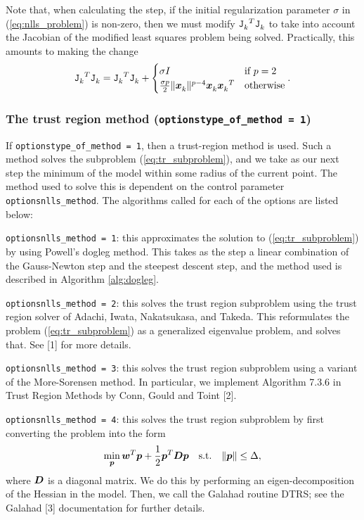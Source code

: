 Note that, when calculating the step, if the initial regularization parameter $\sigma$ in (\ref{eq:nlls_problem}) is 
non-zero, then we must modify ${\iter[k]{\tJ}}^T\iter[k]{\tJ}$  to take into 
account the Jacobian of the modified least squares problem being solved.  Practically, this amounts to making the change
\[
{\iter[k]{\tJ}}^T\iter[k]{\tJ} = {\iter[k]{\tJ}}^T\iter[k]{\tJ} + 
 \begin{cases}
   \sigma I & \text{if }p = 2\\
   \frac{\sigma p}{2} \|\iter[k]{\vx}\|^{p-4}\iter[k]{\vx}{\iter[k]{\vx}}^T & \text{otherwise}
 \end{cases}.
\]

\subsubsection{The trust region method ({\tt options\ct type\_of\_method = 1})}
\label{sec:trust-region}

If {\tt options\ct type\_of\_method = 1}, then a trust-region method is used.  Such a method solves the subproblem (\ref{eq:tr_subproblem}), and we take as our next step
the minimum of the model within some radius of the current point.  The method used to solve
this is dependent on the control parameter {\tt options\ct nlls\_method}. The algorithms called for each of the options are listed below:
\begin{description}
\item {\tt options\ct nlls\_method = 1}: this approximates the solution to (\ref{eq:tr_subproblem}) by using Powell's dogleg method.  This takes as the step a linear combination of the Gauss-Newton step and the steepest descent step, and the method used is described in Algorithm \ref{alg:dogleg}.
\item {\tt options\ct nlls\_method = 2}: this solves the trust region subproblem using the trust region solver of  Adachi, Iwata, Nakatsukasa, and Takeda.  This reformulates the 
problem (\ref{eq:tr_subproblem}) as a generalized eigenvalue problem, and solves that.  See
[1] for more details.
\item {\tt options\ct nlls\_method = 3}: this solves the trust region subproblem using 
a variant of the More-Sorensen method.  In particular, we implement Algorithm 7.3.6
 in Trust Region Methods by Conn, Gould and Toint [2].
\item {\tt options\ct nlls\_method = 4}: this solves the trust region subproblem by first 
converting the problem into the form
$$\min_\vp \vw^T \vp + \frac{1}{2} \vp^T \vD \vp \quad {\rm s.t.} \quad \|\vp\| \leq \Delta,$$
where $\vD$ is a diagonal matrix.  We do this by performing an eigen-decomposition of 
the Hessian in the model.  Then, we call the {\sc Galahad} routine {\sc DTRS}; see 
the {\sc Galahad} [3] documentation for further details.
\end{description}

